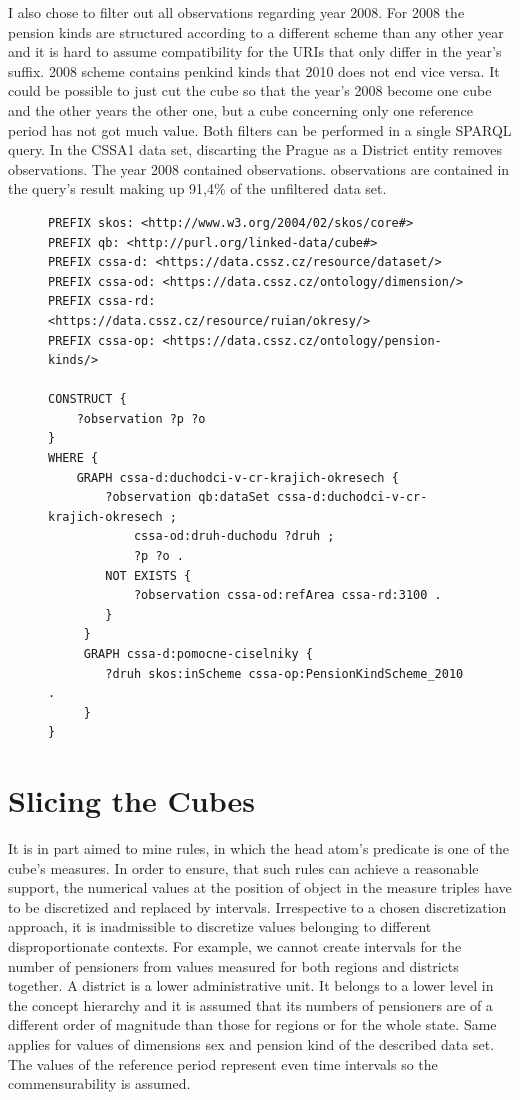 I also chose to filter out all observations regarding year 2008. For 2008 the pension kinds are structured according to a different scheme than any other year and it is hard to assume compatibility for the URIs that only differ in the year's suffix. 2008 scheme contains penkind kinds that 2010 does not end vice versa. It could be possible to just cut the cube so that the year's 2008 become one cube and the other years the other one, but a cube concerning only one reference period has not got much value. Both filters can be performed in a single SPARQL query. In the CSSA1 data set, discarting the Prague as a District entity removes  observations. The year 2008 contained  observations.  observations are contained in the query's result making up 91,4\% of the unfiltered data set.

\begin{figure}[h]
\begin{lstlisting}[language = SPARQL, caption={SPARQL query to filter the CSSA1 data set (Source: author)}, label={sparqlexample},captionpos=b escapeinside={(*@}{@*)}]
PREFIX skos: <http://www.w3.org/2004/02/skos/core#>
PREFIX qb: <http://purl.org/linked-data/cube#>
PREFIX cssa-d: <https://data.cssz.cz/resource/dataset/>
PREFIX cssa-od: <https://data.cssz.cz/ontology/dimension/>
PREFIX cssa-rd: <https://data.cssz.cz/resource/ruian/okresy/>
PREFIX cssa-op: <https://data.cssz.cz/ontology/pension-kinds/>

CONSTRUCT {
    ?observation ?p ?o
} 
WHERE {
    GRAPH cssa-d:duchodci-v-cr-krajich-okresech {
        ?observation qb:dataSet cssa-d:duchodci-v-cr-krajich-okresech ;
            cssa-od:druh-duchodu ?druh ;
            ?p ?o .
        NOT EXISTS {
            ?observation cssa-od:refArea cssa-rd:3100 .
        }
     }
     GRAPH cssa-d:pomocne-ciselniky {
        ?druh skos:inScheme cssa-op:PensionKindScheme_2010 .
     }
}
\end{lstlisting}
\end{figure}

\section{Slicing the Cubes\label{cssaSlicing}}

It is in part aimed to mine rules, in which the head atom's predicate is one of the cube's measures. In order to ensure, that such rules can achieve a reasonable support, the numerical values at the position of object in the measure triples have to be discretized and replaced by intervals. Irrespective to a chosen discretization approach, it is inadmissible to discretize values belonging to different disproportionate contexts. For example, we cannot create intervals for the number of pensioners from values measured for both regions and districts together. A district is a lower administrative unit. It belongs to a lower level in the concept hierarchy and it is assumed that its numbers of pensioners are of a different order of magnitude than those for regions or for the whole state. Same applies for values of dimensions sex and pension kind of the described data set. The values of the reference period represent even time intervals so the commensurability is assumed.

